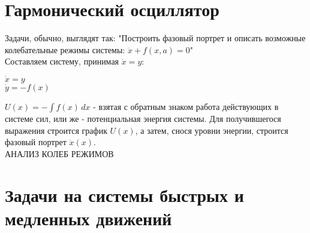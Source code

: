 \newcommand{\colontitulAutors}{astronom\_v\_cube et}
\newcommand{\colontitulYear}{2022}
\newcommand{\colontitulEducationalSubject}{Алгоритмы решения задач по теории колебаний}
\newcommand{\colontitulTeacher}{LaTex}




	\small
	\begin{multicols*}{2}

		\section{Гармонический осциллятор}

		Задачи, обычно, выглядят так:
		"Построить фазовый портрет и описать возможные колебательные режимы системы: $ \ddot{x} + f(x, a) = 0 $"\\
		Составляем систему, принимая $\dot{x} = y$:\\
		\begin{cases}
			$\dot{x} = y$\\
			$\dot{y} = -f(x)$
		\end{cases}
		$U(x) = -\int f(x) \,dx $ - взятая с обратным знаком работа действующих в системе сил, или же - потенциальная энергия системы. Для  получившегося выражения строится график $U(x)$, а затем, снося уровни энергии, строится фазовый портрет $\dot{x}(x)$.\\
		АНАЛИЗ КОЛЕБ РЕЖИМОВ


		\section{Задачи на системы быстрых и медленных движений}


	\end{multicols*}
